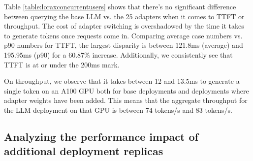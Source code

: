\begin{table}[ht]


\vspace{5mm}
\caption{Benchmarking 25 adapters on 1xA100 with queries that simulate real load. \label{table:loraxconcurrentusers}}

\end{table}

Table \ref{table:loraxconcurrentusers} shows that there’s no significant difference between querying the base LLM vs. the 25 adapters when it comes to TTFT or throughput. The cost of adapter switching is overshadowed by the time it takes to generate tokens once requests come in. Comparing average case numbers vs. p90 numbers for TTFT, the largest disparity is between 121.8ms (average) and 195.95ms (p90) for a 60.87\% increase. Additionally, we consistently see that TTFT is at or under the 200ms mark.

On throughput, we observe that it takes between 12 and 13.5ms to generate a single token on an A100 GPU both for base deployments and deployments where adapter weights have been added. This means that the aggregate throughput for the LLM deployment on that GPU is between 74 tokens/s and 83 tokens/s.

\subsection{Analyzing the performance impact of additional deployment replicas}


